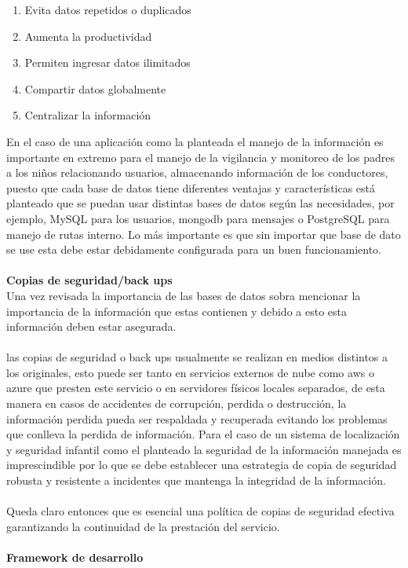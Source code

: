 \documentclass[12pt,onehalfspacing]{report}
\begin{document}
\begin{enumerate}
    \item Evita datos repetidos o duplicados
    \item Aumenta la productividad
    \item Permiten ingresar datos ilimitados
    \item Compartir datos globalmente
    \item Centralizar la información
\end{enumerate}
En el caso de una aplicación como la planteada el manejo de la información es importante en extremo para el manejo de la vigilancia y monitoreo de los padres a los niños relacionando usuarios, almacenando información de los conductores, puesto que cada base de datos tiene diferentes ventajas y características está planteado que se puedan usar distintas bases de datos según las necesidades, por ejemplo, MySQL para los usuarios, mongodb para mensajes o PostgreSQL para manejo de rutas interno. Lo más importante es que sin importar que base de dato se use esta debe estar debidamente configurada para un buen funcionamiento.\\\\
\textbf{Copias de seguridad/back ups}\\
Una vez revisada la importancia de las bases de datos sobra mencionar la importancia de la información que estas contienen y debido a esto esta información deben estar asegurada.\\\\
las copias de seguridad o back ups usualmente se realizan en medios distintos a los originales, esto puede ser tanto en servicios externos de nube como aws o azure que presten este servicio o en servidores físicos locales separados, de esta manera en casos de accidentes de corrupción, perdida o destrucción, la información perdida pueda ser respaldada y recuperada evitando los problemas que conlleva la perdida de información.
Para el caso de un sistema de localización y seguridad infantil como el planteado la seguridad de la información manejada es imprescindible por lo que se debe establecer una estrategia de copia de seguridad robusta y resistente a incidentes que mantenga la integridad de la información.\\\\Queda claro entonces que es esencial una política de copias de seguridad efectiva garantizando la continuidad de la prestación del servicio.\\\\
\textbf{Framework de desarrollo}\\
\end{document}
